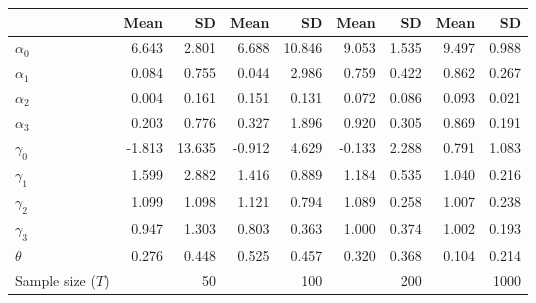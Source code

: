 
\begin{tabular}[t]{lrrrrrrrr}
\toprule
  & Mean & SD & Mean  & SD  & Mean   & SD   & Mean    & SD   \\
\midrule
$\alpha_{0}$ & 6.643 & 2.801 & 6.688 & 10.846 & 9.053 & 1.535 & 9.497 & 0.988\\
$\alpha_{1}$ & 0.084 & 0.755 & 0.044 & 2.986 & 0.759 & 0.422 & 0.862 & 0.267\\
$\alpha_{2}$ & 0.004 & 0.161 & 0.151 & 0.131 & 0.072 & 0.086 & 0.093 & 0.021\\
$\alpha_{3}$ & 0.203 & 0.776 & 0.327 & 1.896 & 0.920 & 0.305 & 0.869 & 0.191\\
$\gamma_{0}$ & -1.813 & 13.635 & -0.912 & 4.629 & -0.133 & 2.288 & 0.791 & 1.083\\
$\gamma_{1}$ & 1.599 & 2.882 & 1.416 & 0.889 & 1.184 & 0.535 & 1.040 & 0.216\\
$\gamma_{2}$ & 1.099 & 1.098 & 1.121 & 0.794 & 1.089 & 0.258 & 1.007 & 0.238\\
$\gamma_{3}$ & 0.947 & 1.303 & 0.803 & 0.363 & 1.000 & 0.374 & 1.002 & 0.193\\
$\theta$ & 0.276 & 0.448 & 0.525 & 0.457 & 0.320 & 0.368 & 0.104 & 0.214\\
Sample size ($T$) &  & 50 &  & 100 &  & 200 &  & 1000\\
\bottomrule
\end{tabular}
